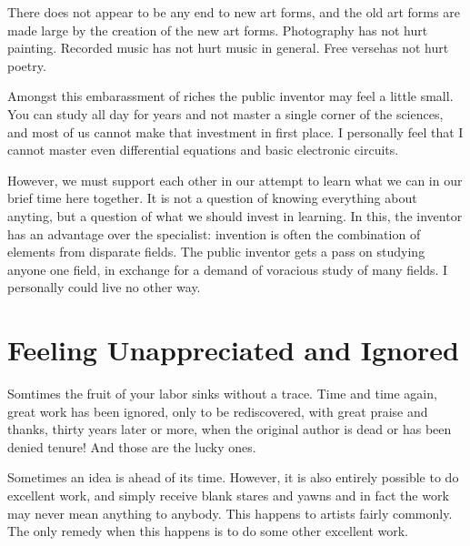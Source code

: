 \documentclass[
	fontsize=10pt, %
	twoside=false, %
	secnumdepth=1, %
]{kaobook}
\begin{document}
There does not appear to be any end to new art forms, and the
old art forms are made large by the creation of the new art forms.
Photography has not hurt painting.
Recorded music has not hurt music in general.
Free versehas not hurt poetry.

Amongst this embarassment of riches the public inventor
may feel a little small.
You can study all day for years and not master a single corner
of the sciences, and most of us cannot make that investment in
first place.
I personally feel that I cannot master even differential equations
and basic electronic circuits.

However, we must support each other in our attempt to learn what we can
in our brief time here together. It is not a question of knowing everything
about anyting, but a question of what we should invest in learning.
In this, the inventor has an advantage over the specialist:
invention is often the combination of elements from disparate fields.
The public inventor gets a pass on studying anyone one field,
in exchange for a demand of voracious study of many fields.
I personally could live no other way.

\section{Feeling Unappreciated and Ignored}

Somtimes the fruit of your labor sinks without a trace.
Time and time again, great work has been ignored, only to be
rediscovered, with great praise and thanks, thirty years later or more,
when the original author is dead or has been denied tenure!
And those are the lucky ones.

Sometimes an idea is ahead of its time.
However, it is also entirely possible to do excellent work, and simply
receive blank stares and yawns and in fact the work may never
mean anything to anybody.
This happens to artists fairly commonly.
The only remedy when this happens is to do some other excellent work.
\end{document}
